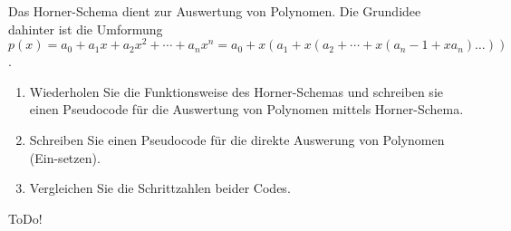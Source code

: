 
\begin{exercise}

Das Horner-Schema dient zur Auswertung von Polynomen.
Die Grundidee dahinter ist die Umformung $p(x) = a_0 + a_1 x + a_2 x^2 + \cdots + a_n x^n = a_0 + x (a_1 + x (a_2 + \cdots + x (a_n - 1 + x a_n) \ldots))$.

\begin{enumerate}[label = (\roman*)]
    \item Wiederholen Sie die Funktionsweise des Horner-Schemas und schreiben sie einen Pseudocode für die Auswertung von Polynomen mittels Horner-Schema.
    \item Schreiben Sie einen Pseudocode für die direkte Auswerung von Polynomen (Ein-setzen).
    \item Vergleichen Sie die Schrittzahlen beider Codes.    
\end{enumerate}

\end{exercise}


\begin{solution}

ToDo!

\end{solution}

